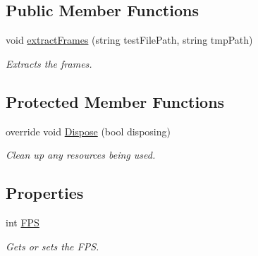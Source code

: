 \subsection*{Public Member Functions}
\begin{DoxyCompactItemize}
\item 
void \hyperlink{class_a_rdev_kit_1_1_controller_1_1_test_controller_1_1_process_video_window_ac67aa1f6af8e93d55444e9a2a95fd47f}{extract\-Frames} (string test\-File\-Path, string tmp\-Path)
\begin{DoxyCompactList}\small\item\em Extracts the frames. \end{DoxyCompactList}\end{DoxyCompactItemize}
\subsection*{Protected Member Functions}
\begin{DoxyCompactItemize}
\item 
override void \hyperlink{class_a_rdev_kit_1_1_controller_1_1_test_controller_1_1_process_video_window_ac30e02694f12428387eabe473988b245}{Dispose} (bool disposing)
\begin{DoxyCompactList}\small\item\em Clean up any resources being used. \end{DoxyCompactList}\end{DoxyCompactItemize}
\subsection*{Properties}
\begin{DoxyCompactItemize}
\item 
int \hyperlink{class_a_rdev_kit_1_1_controller_1_1_test_controller_1_1_process_video_window_a8f9c4bafd5143ae34f81c5cc11b9a518}{F\-P\-S}
\begin{DoxyCompactList}\small\item\em Gets or sets the F\-P\-S. \end{DoxyCompactList}\end{DoxyCompactItemize}


